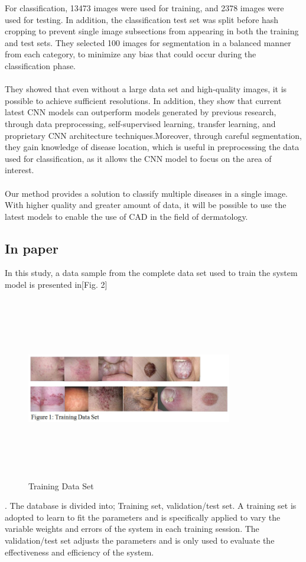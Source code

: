 For classification, 13473 images were used for training, and 2378 images were used for testing. In addition, the classification test set was split before hash cropping to prevent single image subsections from appearing in both the training and test sets.
They selected 100 images for segmentation in a balanced manner from each category, to minimize any bias that could occur during the classification phase.\\\\
They showed that even without a large data set and high-quality images, it is possible to achieve sufficient resolutions. In addition, they show that current latest CNN models can outperform models generated by previous research, through data preprocessing, self-supervised learning, transfer learning, and proprietary CNN architecture techniques.Moreover, through careful segmentation, they gain knowledge of disease location, which is useful in preprocessing the data used for classification, as it allows the CNN model to focus on the area of interest.\\\\
Our method provides a solution to classify multiple diseases in a single image. With higher quality and greater amount of data, it will be possible to use the latest models to enable the use of CAD in the field of dermatology.

\subsection{In paper\cite{r5}}
In this study, a data sample from the complete data set used to train the system model is presented in[Fig. 2]
\begin{figure}[!ht]
\centering 
\includegraphics[height= 8cm, width=9cm]{backmatter/figures/fig2.jpg}
\caption{Training Data Set}
\end{figure}.
 The database is divided into; Training set, validation/test set. A training set is adopted to learn to fit the parameters and is specifically applied to vary the variable weights and errors of the system in each training session. The validation/test set adjusts the parameters and is only used to evaluate the effectiveness and efficiency of the system.\\\\
 
